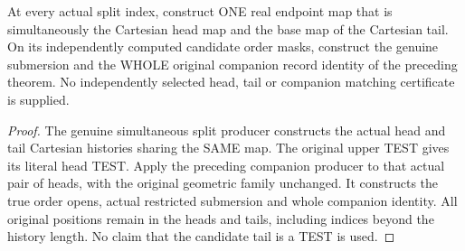 \begin{theorem}
\label{hir:original-untested-modeled-split-companion-smooth-mask}
\leanok
At every actual split index, construct ONE real endpoint map that is
simultaneously the Cartesian head map and the base map of the
Cartesian tail. On its independently computed candidate order masks,
construct the genuine submersion and the WHOLE original companion
record identity of the preceding theorem. No independently selected
head, tail or companion matching certificate is supplied.
\end{theorem}
\begin{proof}
The genuine simultaneous split producer constructs the actual head
and tail Cartesian histories sharing the SAME map. The original upper
TEST gives its literal head TEST. Apply the preceding companion
producer to that actual pair of heads, with the original geometric
family unchanged. It constructs the true order opens, actual
restricted submersion and whole companion identity. All original
positions remain in the heads and tails, including indices beyond the
history length. No claim that the candidate tail is a TEST is used.
\end{proof}

